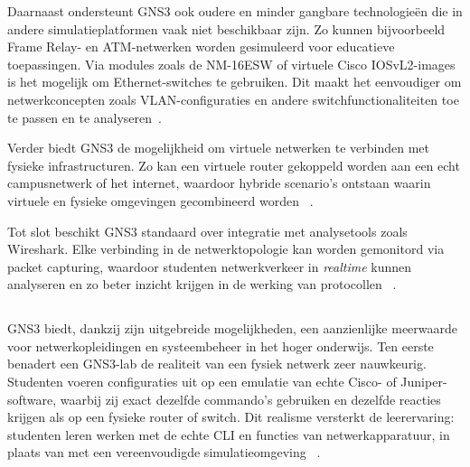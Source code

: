 \vspace{0.3cm}

Daarnaast ondersteunt GNS3 ook oudere en minder gangbare technologieën die in andere simulatieplatformen vaak niet beschikbaar zijn. Zo kunnen bijvoorbeeld Frame Relay- en ATM-netwerken worden gesimuleerd voor educatieve toepassingen. Via modules zoals de NM-16ESW of virtuele Cisco IOSvL2-images is het mogelijk om Ethernet-switches te gebruiken. Dit maakt het eenvoudiger om netwerkconcepten zoals VLAN-configuraties en andere switchfunctionaliteiten toe te passen en te analyseren~\autocite{gns3_doc2025}.

\vspace{0.3cm}

Verder biedt GNS3 de mogelijkheid om virtuele netwerken te verbinden met fysieke infrastructuren. Zo kan een virtuele router gekoppeld worden aan een echt campusnetwerk of het internet, waardoor hybride scenario’s ontstaan waarin virtuele en fysieke omgevingen gecombineerd worden ~\autocite{gns3_doc2025}.

\vspace{0.3cm}

Tot slot beschikt GNS3 standaard over integratie met analysetools zoals Wireshark. Elke verbinding in de netwerktopologie kan worden gemonitord via packet capturing, waardoor studenten netwerkverkeer in \textit{realtime} kunnen analyseren en zo beter inzicht krijgen in de werking van protocollen ~\autocite{Golightly2023}.



\vspace{0.3cm}

\subsection{}%
\label{sec:Functionaliteiten}

GNS3 biedt, dankzij zijn uitgebreide mogelijkheden, een aanzienlijke meerwaarde voor netwerkopleidingen en systeembeheer in het hoger onderwijs. Ten eerste benadert een GNS3-lab de realiteit van een fysiek netwerk zeer nauwkeurig. Studenten voeren configuraties uit op een emulatie van echte Cisco- of Juniper-software, waarbij zij exact dezelfde commando’s gebruiken en dezelfde reacties krijgen als op een fysieke router of switch. Dit realisme versterkt de leerervaring: studenten leren werken met de echte CLI en functies van netwerkapparatuur, in plaats van met een vereenvoudigde simulatieomgeving ~\autocite{Kuzmenko2016}.

